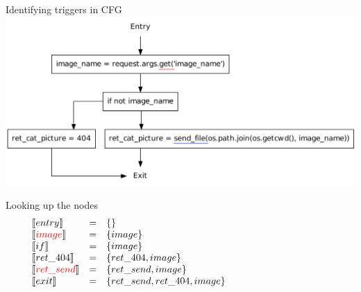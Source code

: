 \begin{frame}{Identifying triggers in CFG}
  \includegraphics[width=1.05\textwidth]{graphics/cfg_path_traversal_triggers}
\end{frame}

\begin{frame}{Looking up the nodes}
\[
\begin{array}{lclcl}
  \constraint{entry} & = & \{\} &&\\
  \assignconstraint{image} & = & \{image\} &&\\
  \constraint{if} & = & \{image\} &&\\
  \constraint{ret\_404} & = & \{ret\_404, image\} &&\\
  \assignconstraint{ret\_send} & = & \{ret\_send, image\} &&\\
  \constraint{exit} & = & \{ret\_send, ret\_404, image\} &&\\
  && \phantom{\{command, param\}} && \phantom{\{command, param\}}
\end{array}
\]
\end{frame}
